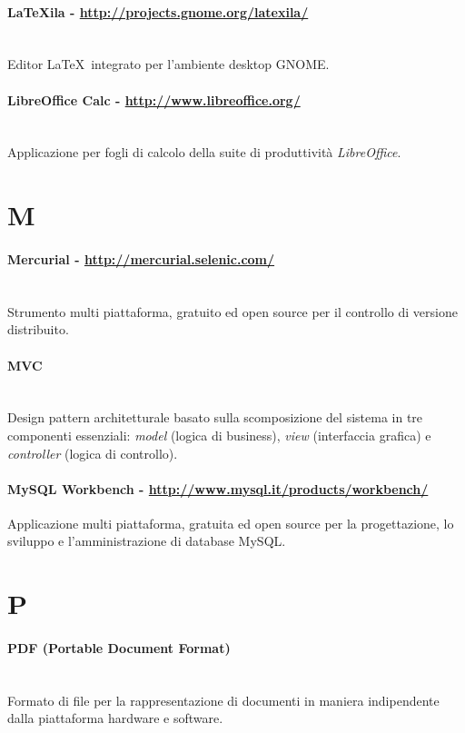 \paragraph{LaTeXila - \url{http://projects.gnome.org/latexila/}} \hfill \\
Editor \LaTeX\ integrato per l'ambiente desktop GNOME.
\paragraph{LibreOffice Calc - \url{http://www.libreoffice.org/}} \hfill \\
Applicazione per fogli di calcolo della suite di produttività \textit{LibreOffice}.

\section*{M}
\paragraph{Mercurial - \url{http://mercurial.selenic.com/}} \hfill \\
Strumento multi piattaforma, gratuito ed open source per il controllo di versione distribuito.
\paragraph{MVC} \hfill \\
Design pattern architetturale basato sulla scomposizione del sistema in tre componenti essenziali: \textit{model} (logica di business), \textit{view} (interfaccia grafica) e \textit{controller} (logica di controllo).
\paragraph{MySQL Workbench - \url{http://www.mysql.it/products/workbench/}}
Applicazione multi piattaforma, gratuita ed open source per la progettazione, lo sviluppo e l'amministrazione di database MySQL.

\section*{P}
\paragraph{PDF (Portable Document Format)} \hfill \\
Formato di file per la rappresentazione di documenti in maniera indipendente dalla piattaforma hardware e software.
